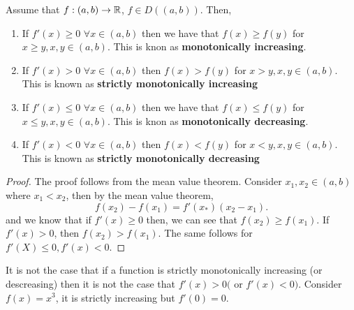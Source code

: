 \documentclass[a4paper]{article}
\begin{document}
\begin{prop}
  Assume that $f: (a,b) \to \mathbb{R}$, $f \in D((a,b))$. Then,
  \begin{enumerate}
    \item If $f'(x) \geq 0$  $\forall x \in (a,b)$ then we have that  $f(x) \geq f(y)$ for  $x \geq y, x,y \in (a,b)$. This is knon as \textbf{monotonically increasing}.
    \item If  $f'(x) > 0$ $\forall x \in (a,b)$ then  $f(x) > f(y)$ for  $x > y, x,y \in (a,b)$. This is known as \textbf{strictly monotonically increasing}  
    \item If $f'(x) \leq 0$  $\forall x \in (a,b)$ then we have that  $f(x) \leq f(y)$ for  $x \leq y, x,y \in (a,b)$. This is knon as \textbf{monotonically decreasing}.
    \item If  $f'(x) < 0$ $\forall x \in (a,b)$ then  $f(x) < f(y)$ for  $x < y, x,y \in (a,b)$. This is known as \textbf{strictly monotonically decreasing}  
  \end{enumerate}

  \noindent\hrulefill

  \begin{proof} 
    The proof follows from the mean value theorem. Consider $x_1,x_2 \in (a,b)$ where $x_1 < x_2$, then by the mean value theorem,
    \[
    f(x_2) - f(x_1) = f'(x_{*}) (x_2 - x_1)
    .\] 
    and we know that if $f'(x) \geq 0$ then, we can see that  $f(x_2) \geq f(x_1)$. If  $f'(x) > 0$, then  $f(x_2) > f(x_1)$. The same follows for $f'(X) \leq 0, f'(x) < 0$.
  \end{proof}
\end{prop}

\begin{remark}
  It is not the case that if a function is strictly monotonically increasing (or descreasing) then  it is not the case that $f'(x) > 0 ($ or $f'(x) <0)$. Consider  $f(x) = x^{3}$, it is strictly increasing but $f'(0) = 0$.
\end{remark}
\end{document}
